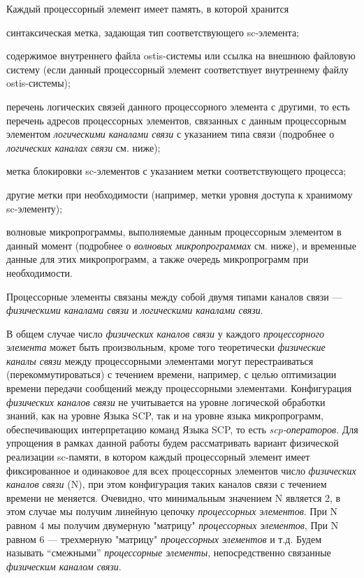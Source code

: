 \begin{textitemize}
	\item Каждый процессорный элемент имеет память, в которой хранится
	\begin{textitemize}
		\item синтаксическая метка, задающая тип соответствующего sc-элемента;
		\item содержимое внутреннего файла ostis-системы или ссылка на внешнюю файловую систему (если данный процессорный элемент соответствует внутреннему файлу ostis-системы);
		\item перечень логических связей данного процессорного элемента с другими, то есть перечень адресов процессорных элементов, связанных с данным процессорным элементом \textit{логическими каналами связи} с указанием типа связи (подробнее о \textit{логических каналах связи} см. ниже);
		\item метка блокировки sc-элементов с указанием метки соответствующего процесса;
		\item другие метки при необходимости (например, метки уровня доступа к хранимому sc-элементу);
		\item волновые микропрограммы, выполняемые данным процессорным элементом в данный момент (подробнее о \textit{волновых микропрограммах} см. ниже), и временные данные для этих микропрограмм, а также очередь микропрограмм при необходимости.
	\end{textitemize}
	\item Процессорные элементы связаны между собой двумя типами каналов связи --- \textit{физическими каналами связи} и \textit{логическими каналами связи}. 
	\begin{textitemize}
		\item В общем случае число \textit{физических каналов связи} у каждого \textit{процессорного элемента} может быть произвольным, кроме того теоретически \textit{физические каналы связи} между процессорными элементами могут перестраиваться (перекоммутироваться) с течением времени, например, с целью оптимизации времени передачи сообщений между процессорными элементами. Конфигурация \textit{физических каналов связи} не учитывается на уровне логической обработки знаний, как на уровне Языка SCP, так и на уровне языка микропрограмм, обеспечивающих интерпретацию команд Языка SCP, то есть \textit{scp-операторов}. Для упрощения в рамках данной работы будем рассматривать вариант физической реализации sc-памяти, в котором каждый процессорный элемент имеет фиксированное и одинаковое для всех процессорных элементов число \textit{физических каналов связи} (N), при этом конфигурация таких каналов связи с течением времени не меняется. Очевидно, что минимальным значением N является 2, в этом случае мы получим линейную цепочку \textit{процессорных элементов}. При N равном 4 мы получим двумерную "матрицу"{} \textit{процессорных элементов}, При N равном 6 --- трехмерную "матрицу"{} \textit{процессорных элементов} и т.д. Будем называть ``смежными'' \textit{процессорные элементы}, непосредственно связанные \textit{физическим каналом связи}.

\end{textitemize}
\end{textitemize}
